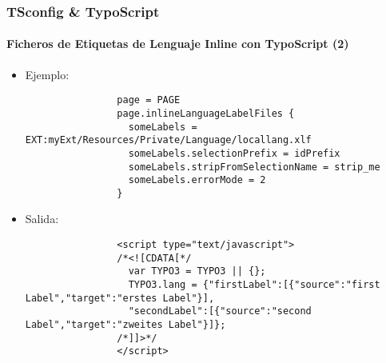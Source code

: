 \begin{frame}[fragile]
	\frametitle{TSconfig \& TypoScript}
	\framesubtitle{Ficheros de Etiquetas de Lenguaje Inline con TypoScript (2)}

	\lstset{basicstyle=\tiny\ttfamily}

	\begin{itemize}

		\item Ejemplo:

			\begin{lstlisting}
				page = PAGE
				page.inlineLanguageLabelFiles {
				  someLabels = EXT:myExt/Resources/Private/Language/locallang.xlf
				  someLabels.selectionPrefix = idPrefix
				  someLabels.stripFromSelectionName = strip_me
				  someLabels.errorMode = 2
				}
			\end{lstlisting}

		\item Salida:

			\begin{lstlisting}
				<script type="text/javascript">
				/*<![CDATA[*/
				  var TYPO3 = TYPO3 || {};
				  TYPO3.lang = {"firstLabel":[{"source":"first Label","target":"erstes Label"}],
				  "secondLabel":[{"source":"second Label","target":"zweites Label"}]};
				/*]]>*/
				</script>
			\end{lstlisting}

	\end{itemize}

\end{frame}

